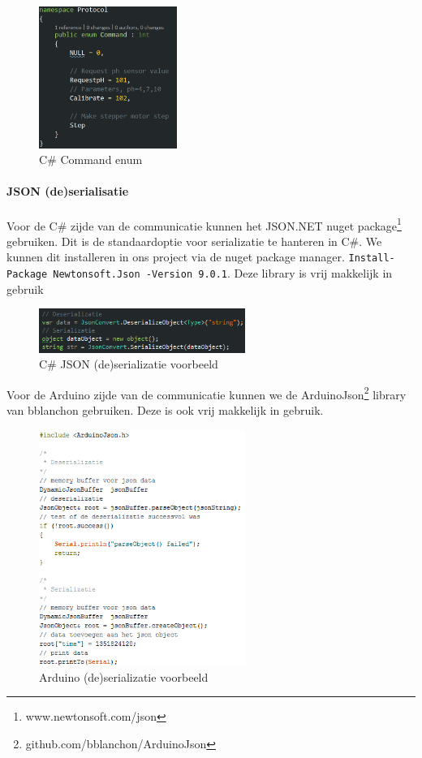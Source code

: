\documentclass[11pt]{report}
\newcommand{\code}[1]{{\texttt{#1}}}
\newcommand{\lbr}{\hfill\break}
\begin{document}
\begin{figure}[H]
  \centering
  \includegraphics[width=0.4\textwidth]{csharp_commandEnum.png}
  \caption{C\# Command enum}
\end{figure}

\paragraph{JSON (de)serialisatie}
Voor de C\# zijde van de communicatie kunnen het JSON.NET nuget package\footnote{www.newtonsoft.com/json} gebruiken. Dit is de standaardoptie voor serializatie te hanteren in C\#. We kunnen dit installeren in ons project via de nuget package manager. \code{Install-Package Newtonsoft.Json -Version 9.0.1}. Deze library is vrij makkelijk in gebruik\lbr
\begin{figure}[H]
  \centering
  \includegraphics[width=0.6\textwidth]{csharp_json.png}
  \caption{C\# JSON (de)serializatie voorbeeld}
\end{figure}

\newpage
Voor de Arduino zijde van de communicatie kunnen we de ArduinoJson\footnote{github.com/bblanchon/ArduinoJson} library van bblanchon gebruiken. Deze is ook vrij makkelijk in gebruik.\lbr
\begin{figure}[H]
  \centering
  \includegraphics[width=0.6\textwidth]{arduino_json.png}
  \caption{Arduino (de)serializatie voorbeeld}
\end{figure}
\end{document}

